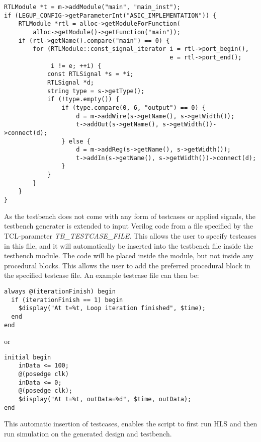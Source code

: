 \begin{verbatim}
RTLModule *t = m->addModule("main", "main_inst");
if (LEGUP_CONFIG->getParameterInt("ASIC_IMPLEMENTATION")) {
    RTLModule *rtl = alloc->getModuleForFunction(
        alloc->getModule()->getFunction("main"));
    if (rtl->getName().compare("main") == 0) {
        for (RTLModule::const_signal_iterator i = rtl->port_begin(),
                                              e = rtl->port_end();
             i != e; ++i) {
            const RTLSignal *s = *i;
            RTLSignal *d;
            string type = s->getType();
            if (!type.empty()) {
                if (type.compare(0, 6, "output") == 0) {
                    d = m->addWire(s->getName(), s->getWidth());
                    t->addOut(s->getName(), s->getWidth())->connect(d);
                } else {
                    d = m->addReg(s->getName(), s->getWidth());
                    t->addIn(s->getName(), s->getWidth())->connect(d);
                }
            }
        }
    }
}
\end{verbatim}

As the testbench does not come with any form of testcases or applied signals, the testbench generater is extended to input Verilog code from a file specified by the TCL-parameter \textit{TB\_TESTCASE\_FILE}. This allows the user to specify testcases in this file, and it will automatically be inserted into the testbench file inside the testbench module. The code will be placed inside the module, but not inside any procedural blocks. This allows the user to add the preferred procedural block in the specified testcase file. An example testcase file can then be:

\lstset{language=Verilog, style=Verilogstyle}
\begin{lstlisting}
always @(iterationFinish) begin
  if (iterationFinish == 1) begin
    $display("At t=%t, Loop iteration finished", $time);
  end
end
\end{lstlisting}
or
\begin{lstlisting}
initial begin
    inData <= 100;
    @(posedge clk)
    inData <= 0;
    @(posedge clk);
    $display("At t=%t, outData=%d", $time, outData);
end
\end{lstlisting}
This automatic insertion of testcases, enables the script to first run HLS and then run simulation on the generated design and testbench.
